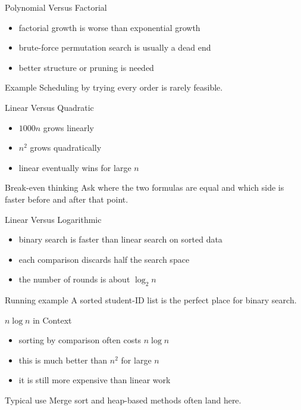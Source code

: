 \documentclass[aspectratio=169,xcolor=dvipsnames]{beamer}
\begin{document}
\begin{frame}{Polynomial Versus Factorial}
  \begin{itemize}
    \item factorial growth is worse than exponential growth
    \item brute-force permutation search is usually a dead end
    \item better structure or pruning is needed
  \end{itemize}
  \begin{exampleblock}{Example}
    Scheduling by trying every order is rarely feasible.
  \end{exampleblock}
\end{frame}

\begin{frame}{Linear Versus Quadratic}
  \begin{itemize}
    \item $1000n$ grows linearly
    \item $n^2$ grows quadratically
    \item linear eventually wins for large $n$
  \end{itemize}
  \begin{block}{Break-even thinking}
    Ask where the two formulas are equal and which side is faster before and after that point.
  \end{block}
\end{frame}

\begin{frame}{Linear Versus Logarithmic}
  \begin{itemize}
    \item binary search is faster than linear search on sorted data
    \item each comparison discards half the search space
    \item the number of rounds is about $\log_2 n$
  \end{itemize}
  \begin{exampleblock}{Running example}
    A sorted student-ID list is the perfect place for binary search.
  \end{exampleblock}
\end{frame}

\begin{frame}{$n \log n$ in Context}
  \begin{itemize}
    \item sorting by comparison often costs $n \log n$
    \item this is much better than $n^2$ for large $n$
    \item it is still more expensive than linear work
  \end{itemize}
  \begin{block}{Typical use}
    Merge sort and heap-based methods often land here.
  \end{block}
\end{frame}
\end{document}
